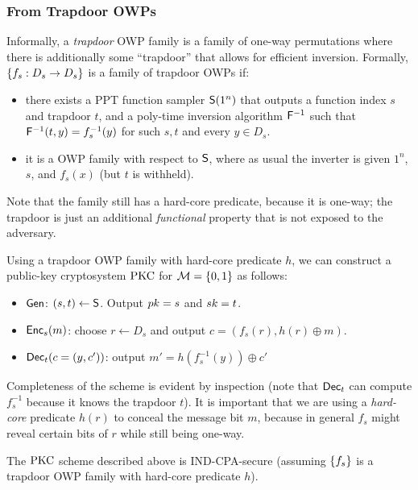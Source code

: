 \documentclass[11pt]{article}
\begin{document}
\subsubsection{From Trapdoor OWPs}
\label{sec:from-trapdoor-owps}

Informally, a \emph{trapdoor} OWP family is a family of one-way
permutations where there is additionally some ``trapdoor'' that allows
for efficient inversion.  Formally, $\{f_{s}: D_{s} \to D_{s}\}$ is a
family of trapdoor OWPs if:
\begin{itemize}
\item there exists a PPT function sampler $\mathsf{S}(1^{n})$ that
  outputs a function index $s$ and trapdoor $t$, and a poly-time
  inversion algorithm $\mathsf{F}^{-1}$ such that $\mathsf{F}^{-1}(t, y) =
  f_{s}^{-1}(y)$ for such $s,t$ and every $y \in D_{s}$.
\item it is a OWP family with respect to $\mathsf{S}$, where as usual
  the inverter is given $1^{n}$, $s$, and $f_{s}(x)$ (but $t$ is
  withheld).
\end{itemize}
Note that the family still has a hard-core predicate, because it is
one-way; the trapdoor is just an additional \emph{functional} property
that is not exposed to the adversary.

Using a trapdoor OWP family with hard-core predicate $h$, we can
construct a public-key cryptosystem $\text{PKC}$ for $\mathcal{M} = \{0,1\}$ as
follows:
\begin{itemize}
\item $\mathsf{Gen}$: $(s, t) \gets \mathsf{S}$.  Output $pk = s$ and $sk =
  t$.
\item $\mathsf{Enc}_{s}(m)$: choose $r \gets D_{s}$ and output $c =
  (f_{s}(r), h(r) \oplus m)$.
\item $\mathsf{Dec}_{t}(c = (y, c'))$: output $m' = h(f_{s}^{-1}(y)) \oplus
  c'$ 
\end{itemize}
Completeness of the scheme is evident by inspection (note that
$\mathsf{Dec}_{t}$ can compute $f_{s}^{-1}$ because it knows the trapdoor
$t$).  It is important that we are using a \emph{hard-core} predicate
$h(r)$ to conceal the message bit $m$, because in general $f_{s}$
might reveal certain bits of $r$ while still being one-way.

\begin{theorem}
  \label{thm:td-owp-pkc}
  The $\text{PKC}$ scheme described above is IND-CPA-secure (assuming
  $\{f_{s}\}$ is a trapdoor OWP family with hard-core predicate
  $h$).
\end{theorem}
\end{document}

